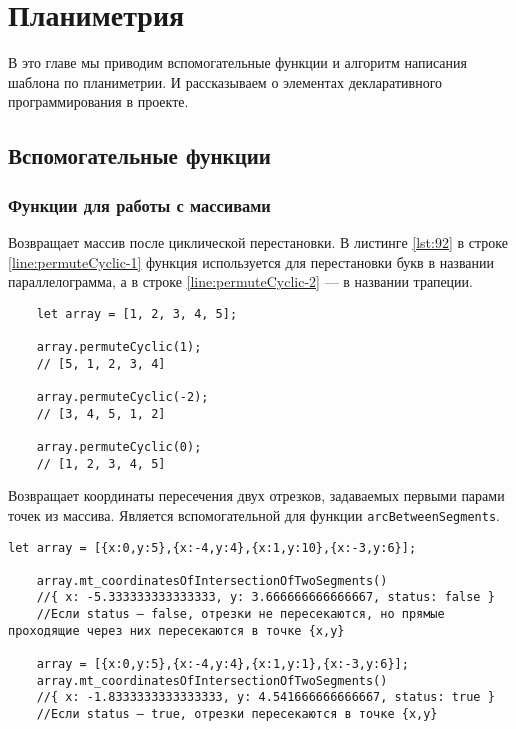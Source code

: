 

\section{Планиметрия}
В это главе мы приводим вспомогательные функции и алгоритм написания шаблона по планиметрии. И рассказываем о элементах декларативного программирования в проекте.
\subsection{Вспомогательные функции}
\subsubsection{Функции для работы с массивами}
Возвращает массив после циклической перестановки.
В листинге \ref{lst:92} в строке \ref{line:permuteCyclic-1} функция используется для перестановки букв в названии параллелограмма, а в строке \ref{line:permuteCyclic-2} — в названии трапеции.

\begin{lstlisting}
    let array = [1, 2, 3, 4, 5];

    array.permuteCyclic(1);
    // [5, 1, 2, 3, 4]

    array.permuteCyclic(-2);
    // [3, 4, 5, 1, 2]

    array.permuteCyclic(0);
    // [1, 2, 3, 4, 5]
    \end{lstlisting}

Возвращает координаты пересечения двух отрезков, задаваемых первыми парами точек из массива. Является вспомогательной для функции \texttt{arcBetweenSegments}.

\begin{lstlisting}[escapechar=|]
    let array = [{x:0,y:5},{x:-4,y:4},{x:1,y:10},{x:-3,y:6}];

    array.mt_coordinatesOfIntersectionOfTwoSegments()
    //{ x: -5.333333333333333, y: 3.666666666666667, status: false }
    //Если status — false, отрезки не пересекаются, но прямые проходящие через них пересекаются в точке {x,y}

    array = [{x:0,y:5},{x:-4,y:4},{x:1,y:1},{x:-3,y:6}];
    array.mt_coordinatesOfIntersectionOfTwoSegments()
    //{ x: -1.8333333333333333, y: 4.541666666666667, status: true }
    //Если status — true, отрезки пересекаются в точке {x,y}
        
\end{lstlisting}

